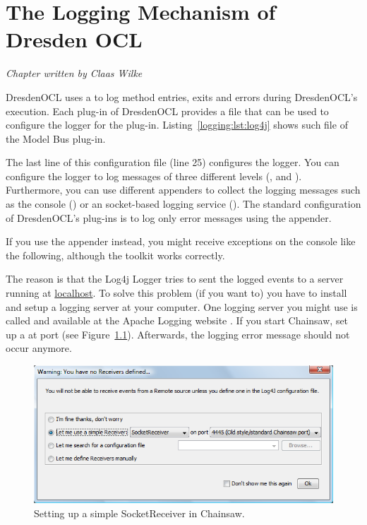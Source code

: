 \chapter{The Logging Mechanism of Dresden OCL}
\label{chapter:logging}

\begin{flushright}
\textit{Chapter written by Claas Wilke}
\end{flushright}

DresdenOCL uses a  to log method entries, exits and
errors during DresdenOCL's execution. Each plug-in of DresdenOCL provides a
 file that can be used to configure the logger for the
plug-in. Listing~\ref{logging:lst:log4j} shows such file of the Model Bus
plug-in.

\begin{figure}[!t]
  
\end{figure}

The last line of this configuration file (line 25) configures the logger. You
can configure the logger to log messages of three different levels
(,  and ). Furthermore, you can use different
appenders to collect the logging messages such as the console () or
an socket-based logging service (). The standard configuration of
DresdenOCL's plug-ins is to log only error messages using the 
appender.

If you use the  appender instead, you might
receive exceptions on the console like the following, although the toolkit 
works correctly.

\begin{center}
\end{center}

The reason is that the Log4j Logger tries to sent the logged events to a server 
running at \url{localhost}. To solve this problem (if you want to) you have to 
install and setup a logging server at your computer. One logging server you
might use is called  and available at the Apache Logging 
website \cite{WWW:chainsaw}. If you start Chainsaw, set up a 
 at port  (see Figure~\ref{pic:logging:chainsaw01}). Afterwards, the logging error 
message should not occur anymore.

\begin{figure}[!htbp]
	\centering
	\includegraphics[width=0.8\linewidth]{figures/logging/chainsaw01}
	\caption{Setting up a simple SocketReceiver in Chainsaw.}
	\label{pic:logging:chainsaw01}
\end{figure}